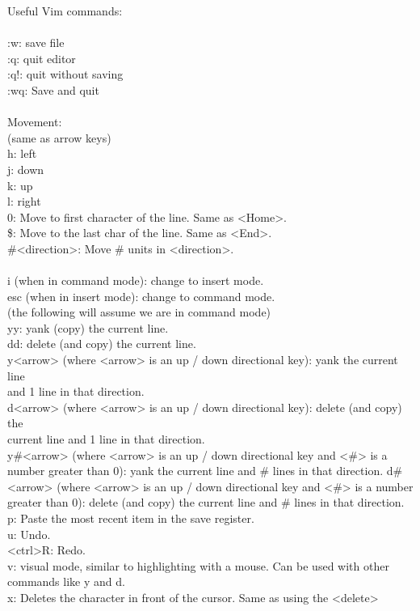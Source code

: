 \documentclass[letterpaper,10pt,titlepage,fleqn]{article}
\begin{document}
Useful Vim commands: \\
\\
:w: save file\\
:q: quit editor\\
:q!: quit without saving\\
:wq: Save and quit\\
\\
Movement:\\
(same as arrow keys)\\
h: left\\
j: down\\
k: up\\
l: right\\
0: Move to first character of the line. Same as <Home>.\\
\$: Move to the last char of the line. Same as <End>.\\
\#<direction>: Move \# units in <direction>.\\
\\
i (when in command mode): change to insert mode.\\
esc (when in insert mode): change to command mode.\\
(the following will assume we are in command mode)\\
yy: yank (copy) the current line.\\
dd: delete (and copy) the current line.\\
y<arrow> (where <arrow> is an up / down directional key): yank the current line\\
and 1 line in that direction.\\
d<arrow> (where <arrow> is an up / down directional key): delete (and copy) the\\
current line and 1 line in that direction.\\
y\#<arrow> (where <arrow> is an up / down directional key and <\#> is a number
greater than 0): yank the current line and \# lines in that direction.
d\#<arrow> (where <arrow> is an up / down directional key and <\#> is a number
greater than 0): delete (and copy) the current line and \# lines in that
direction.\\
p: Paste the most recent item in the save register. \\
u: Undo.\\
<ctrl>R: Redo.\\
v: visual mode, similar to highlighting with a mouse. Can be used with other
commands like y and d.\\
x: Deletes the character in front of the cursor. Same as using the <delete>
\end{document}
